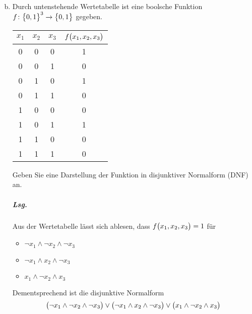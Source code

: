 \documentclass{scrreprt}
\begin{document}
\begin{enumerate}[(a)]
\setcounter{enumi}{1}
\item Durch untenstehende Wertetabelle ist eine boolsche Funktion
  $f \colon \qty\big{0, 1}^3 \to \qty\big{0, 1}$ gegeben.

  \begin{tabular}{|c|c|c|c|}
    \hline
    $x_1$ & $x_2$ & $x_3$ & $f\qty\big(x_1, x_2, x_3)$ \\
    \hline
    0 & 0 & 0 & 1 \\
    0 & 0 & 1 & 0 \\
    0 & 1 & 0 & 1 \\
    0 & 1 & 1 & 0 \\
    1 & 0 & 0 & 0 \\
    1 & 0 & 1 & 1 \\
    1 & 1 & 0 & 0 \\
    1 & 1 & 1 & 0 \\
    \hline
  \end{tabular}

  Geben Sie eine Darstellung der Funktion in disjunktiver Normalform (DNF) an.

  \subparagraph{Lsg.} Aus der Wertetabelle lässt sich ablesen, dass
  $f\qty\big(x_1, x_2, x_3) = 1$ für
  \begin{itemize}
  \item $\neg x_1 \land \neg x_2 \land \neg x_3$
  \item $\neg x_1 \land x_2 \land \neg x_3$
  \item $x_1 \land \neg x_2 \land x_3$
  \end{itemize}

  Dementsprechend ist die disjunktive Normalform
  \[
    \qty\big(\neg x_1 \land \neg x_2 \land \neg x_3) \lor
    \qty\big(\neg x_1 \land x_2 \land \neg x_3) \lor
    \qty\big(x_1 \land \neg x_2 \land x_3)
  \]
\end{enumerate}
\end{document}
